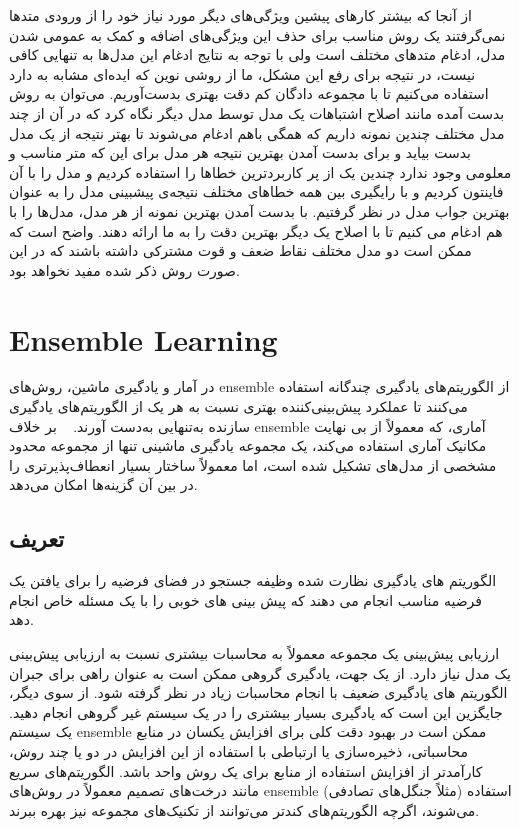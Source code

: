 \documentclass[12pt,a4paper,BCOR=.7cm,headsepline,bibliography=totoc]{report}
\begin{document}
 از آنجا که بیشتر کار‌های پیشین ویژگی‌های دیگر مورد نیاز خود را از ورودی متد‌ها نمی‌گرفتند یک روش مناسب برای حذف این ویژگی‌های اضافه و کمک به عمومی شدن مدل، ادغام متد‌های مختلف است ولی با توجه به نتایج ادغام این مدل‌ها به تنهایی کافی نیست، در نتیجه برای رفع این مشکل، ما از روشی نوین که ایده‌ای مشابه به   \cite{Stacking} دارد استفاده می‌کنیم تا با مجموعه دادگان کم دقت بهتری بدست‌آوریم. می‌توان به روش بدست آمده مانند اصلاح اشتباهات یک مدل توسط مدل دیگر نگاه کرد که در آن از چند مدل مختلف چندین نمونه داریم که همگی باهم ادغام می‌شوند تا بهتر نتیجه از یک مدل بدست بیاید و برای بدست آمدن بهترین نتیجه هر مدل برای این که متر مناسب و معلومی وجود ندارد چندین یک از پر کاربردترین خطا‌ها را استفاده کردیم و مدل را با آن فاینتون کردیم و با رایگیری بین همه خطا‌های مختلف نتیجه‌ی پیشبینی مدل را به عنوان بهترین جواب مدل در نظر گرفتیم. با بدست آمدن بهترین نمونه از هر مدل، مدل‌ها را با هم ادغام می کنیم تا با اصلاح یک دیگر بهترین دقت را به ما ارائه دهند. واضح است که ممکن است دو مدل مختلف نقاط ضعف و قوت مشترکی داشته باشند که در این صورت روش ذکر شده مفید نخواهد بود.
\section{Ensemble Learning}
در آمار و یادگیری ماشین، روش‌های ensemble از الگوریتم‌های یادگیری چندگانه استفاده می‌کنند تا عملکرد پیش‌بینی‌کننده بهتری نسبت به هر یک از الگوریتم‌های یادگیری سازنده به‌تنهایی به‌دست آورند. ~\cite{Opitz, Polikar, Rokach} بر خلاف ensemble آماری، که معمولاً از بی نهایت مکانیک آماری استفاده می‌کند، یک مجموعه یادگیری ماشینی تنها از مجموعه محدود مشخصی از مدل‌های تشکیل شده است، اما معمولاً ساختار بسیار انعطاف‌پذیرتری را در بین آن گزینه‌ها امکان می‌دهد.
\subsection{تعریف}
الگوریتم های یادگیری نظارت شده وظیفه جستجو در فضای فرضیه را برای یافتن یک فرضیه مناسب انجام می دهند که پیش بینی های خوبی را با یک مسئله خاص انجام دهد.~\cite{Blockeel}

ارزیابی پیش‌بینی یک مجموعه معمولاً به محاسبات بیشتری نسبت به ارزیابی پیش‌بینی یک مدل نیاز دارد. از یک جهت، یادگیری گروهی ممکن است به عنوان راهی برای جبران الگوریتم های یادگیری ضعیف با انجام محاسبات زیاد در نظر گرفته شود. از سوی دیگر، جایگزین این است که یادگیری بسیار بیشتری را در یک سیستم غیر گروهی انجام دهید. یک سیستم ensemble ممکن است در بهبود دقت کلی برای افزایش یکسان در منابع محاسباتی، ذخیره‌سازی یا ارتباطی با استفاده از این افزایش در دو یا چند روش، کارآمدتر از افزایش استفاده از منابع برای یک روش واحد باشد. الگوریتم‌های سریع مانند درخت‌های تصمیم معمولاً در روش‌های ensemble (مثلاً جنگل‌های تصادفی) استفاده می‌شوند، اگرچه الگوریتم‌های کندتر می‌توانند از تکنیک‌های مجموعه نیز بهره ببرند.
\end{document}
